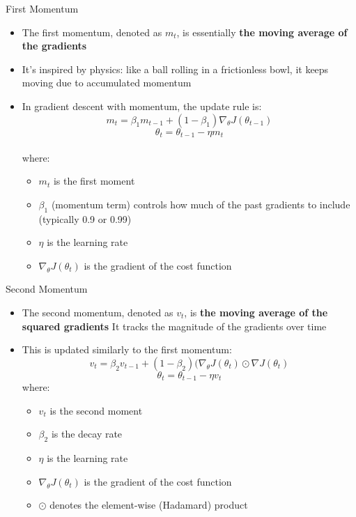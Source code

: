 \documentclass[serif, aspectratio=169]{beamer}
\begin{document}
\begin{frame}{First Momentum}
    \begin{itemize}
        \item The first momentum, denoted as $m_t$, is essentially \textbf{the moving average of the gradients}
         \item It’s inspired by physics: like a ball rolling in a frictionless bowl, it keeps moving due to accumulated momentum
        \item In gradient descent with momentum, the update rule is:
        \[m_t = \beta_1 m_{t-1} + (1 - \beta_1) \nabla_{\theta}J(\theta_{t-1})\]
        \[\theta_t = \theta_{t-1} - \eta m_t\]\\
        where:
        \begin{itemize}
            \item $m_t$ is the first moment
            \item $\beta_1$ (momentum term) controls how much of the past gradients to include (typically 0.9 or 0.99)\\
            \item $\eta$ is the learning rate\\ 
            \item $\nabla_{\theta}J(\theta_t)$ is the gradient of the cost function
        \end{itemize}
    \end{itemize}
\end{frame}

\begin{frame}{Second Momentum}
    \begin{itemize}
        \item The second momentum, denoted as $v_t$, is \textbf{the moving average of the squared gradients} It tracks the magnitude of the gradients over time
        \item This is updated similarly to the first momentum:
        \[v_t = \beta_2 v_{t-1} + (1 - \beta_2) (\nabla_{\theta} J(\theta_t) \odot \nabla J(\theta_t)\]
        \[\theta_t = \theta_{t-1} - \eta v_t\]
        where:
        \begin{itemize}
        \item $v_t$ is the second moment%
        \item$\beta_2$ is the decay rate
        \item$\eta$ is the learning rate
        \item$\nabla_{\theta}J(\theta_t)$ is the gradient of the cost function
        \item $\odot$ denotes the element-wise (Hadamard) product
        \end{itemize}
    \end{itemize}
\end{frame}
\end{document}
